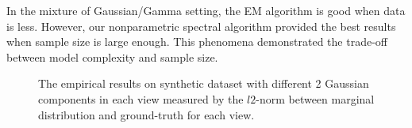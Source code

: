 \documentclass[11pt]{article}
\begin{document}
In the mixture of Gaussian/Gamma setting, the EM algorithm is good when data is less. However, our nonparametric spectral algorithm provided the best results when sample size is large enough. This phenomena demonstrated the trade-off between model complexity and sample size. 

\begin{figure}
\caption{The empirical results on synthetic dataset with different 2 Gaussian components in each view measured by the $l2$-norm between marginal distribution and ground-truth for each view.}
\end{figure}
\end{document}
